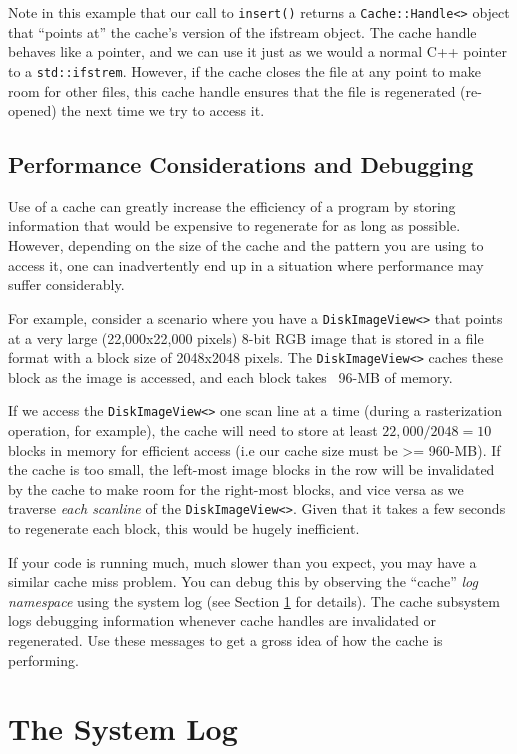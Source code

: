 Note in this example that our call to \verb#insert()# returns a
\verb#Cache::Handle<># object that ``points at'' the cache's version
of the ifstream object.  The cache handle behaves like a pointer, and
we can use it just as we would a normal C++ pointer to a
\verb#std::ifstrem#.  However, if the cache closes the file at any
point to make room for other files, this cache handle ensures that the
file is regenerated (re-opened) the next time we try to access it.

\subsection{Performance Considerations and Debugging}

Use of a cache can greatly increase the efficiency of a program by
storing information that would be expensive to regenerate for as long
as possible.  However, depending on the size of the cache and the
pattern you are using to access it, one can inadvertently end up in a
situation where performance may suffer considerably.

For example, consider a scenario where you have a
\verb#DiskImageView<># that points at a very large (22,000x22,000
pixels) 8-bit RGB image that is stored in a file format with a block
size of 2048x2048 pixels.  The \verb#DiskImageView<># caches these
block as the image is accessed, and each block takes ~96-MB of memory.

If we access the \verb#DiskImageView<># one scan line at a time (during
a rasterization operation, for example), the cache will need to store
at least $22,000/2048 = 10$ blocks in memory for efficient access (i.e
our cache size must be >= 960-MB).  If the cache is too small, the
left-most image blocks in the row will be invalidated by the cache to
make room for the right-most blocks, and vice versa as we traverse
{\em each scanline} of the \verb#DiskImageView<>#.  Given that it
takes a few seconds to regenerate each block, this would be hugely
inefficient.

If your code is running much, much slower than you expect, you may
have a similar cache miss problem.  You can debug this by observing
the ``cache'' {\em log namespace} using the system log (see Section
\ref{sec:log} for details).  The cache subsystem logs debugging
information whenever cache handles are invalidated or regenerated.
Use these messages to get a gross idea of how the cache is
performing.

\section{The System Log}
\label{sec:log}

